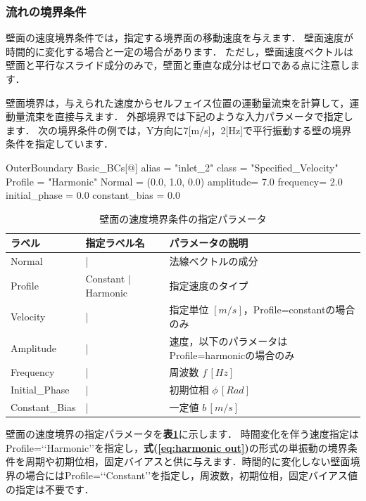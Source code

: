 \subsubsection{流れの境界条件}

壁面の速度境界条件では，指定する境界面の移動速度を与えます．
壁面速度が時間的に変化する場合と一定の場合があります．
ただし，壁面速度ベクトルは壁面と平行なスライド成分のみで，壁面と垂直な成分はゼロである点に注意します．

壁面境界は，与えられた速度からセルフェイス位置の運動量流束を計算して，運動量流束を直接与えます．
外部境界では下記のような入力パラメータで指定します．
次の境界条件の例では，Y方向に7[m/s]，2[Hz]で平行振動する壁の境界条件を指定しています．

{\small
\begin{program}
OuterBoundary {
  Basic_BCs[@] {
    alias    = "inlet_2"
    class    = "Specified_Velocity"
    Profile  = "Harmonic"
    Normal   = (0.0, 1.0, 0.0)
    amplitude= 7.0
    frequency= 2.0
    initial_phase = 0.0
    constant_bias = 0.0
  }
}
\end{program}
}

\begin{table}[htdp]
\caption{壁面の速度境界条件の指定パラメータ}
\begin{center}
\small
\begin{tabular}{lll} \toprule
ラベル & 指定ラベル名 & パラメータの説明\\ \midrule
Normal & | & 法線ベクトルの成分\\
Profile & Constant $|$ Harmonic & 指定速度のタイプ\\
Velocity & | & 指定単位 $[m/s]$，Profile=constantの場合のみ\\
Amplitude & | & 速度，以下のパラメータはProfile=harmonicの場合のみ\\
Frequency & | & 周波数 $f\, [Hz]$\\
Initial\_Phase & | & 初期位相 $\phi\, [Rad]$\\
Constant\_Bias & | & 一定値 $b\, [m/s]$\\
\bottomrule
\end{tabular}
\end{center}
\label{tbl:wall parameter out}
\end{table}

壁面の速度境界の指定パラメータを\textbf{表\ref{tbl:wall parameter out}}に示します．
時間変化を伴う速度指定はProfile=\lq\lq Harmonic\rq\rq を指定し，\textbf{式(\ref{eq:harmonic out})}の形式の単振動の境界条件を周期や初期位相，固定バイアスと供に与えます．時間的に変化しない壁面境界の場合にはProfile=\lq\lq Constant\rq\rq を指定し，周波数，初期位相，固定バイアス値の指定は不要です．

